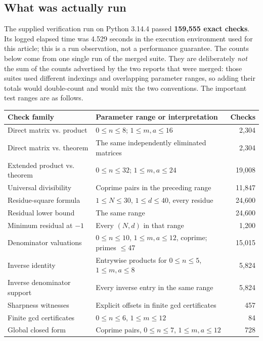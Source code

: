 \documentclass[11pt,a4paper]{article}
\numberwithin{equation}{section}
\theoremstyle{definition}
\theoremstyle{remark}
\begin{document}
\subsection{What was actually run}
The supplied verification run on Python 3.14.4 passed \textbf{159,555 exact checks}. Its logged elapsed time was 4.529 seconds in the execution environment used for this article; this is a run observation, not a performance guarantee. The counts below come from one single run of the merged suite. They are deliberately \emph{not} the sum of the counts advertised by the two reports that were merged: those suites used different indexings and overlapping parameter ranges, so adding their totals would double-count and would mix the two conventions. The important test ranges are as follows.

\begin{center}
\small
\begin{tabular}{@{}p{}p{}r@{}}
\toprule
Check family & Parameter range or interpretation & Checks\\
\midrule
Direct matrix vs. product & $0\leq n\leq8$; $1\leq m,a\leq16$ & 2,304\\
Direct matrix vs. theorem & The same independently eliminated matrices & 2,304\\
Extended product vs. theorem & $0\leq n\leq32$; $1\leq m,a\leq24$ & 19,008\\
Universal divisibility & Coprime pairs in the preceding range & 11,847\\
Residue-square formula & $1\leq N\leq30$, $1\leq d\leq40$, every residue & 24,600\\
Residual lower bound & The same range & 24,600\\
Minimum residual at $-1$ & Every $(N,d)$ in that range & 1,200\\
Denominator valuations & $0\leq n\leq10$, $1\leq m,a\leq12$, coprime; primes $\leq47$ & 15,015\\
Inverse identity & Entrywise products for $0\leq n\leq5$, $1\leq m,a\leq8$ & 5,824\\
Inverse denominator support & Every inverse entry in the same range & 5,824\\
Sharpness witnesses & Explicit offsets in finite gcd certificates & 457\\
Finite gcd certificates & $0\leq n\leq6$, $1\leq m\leq12$ & 84\\
Global closed form & Coprime pairs, $0\leq n\leq7$, $1\leq m,a\leq12$ & 728\\

\end{tabular}
\end{center}
\end{document}
